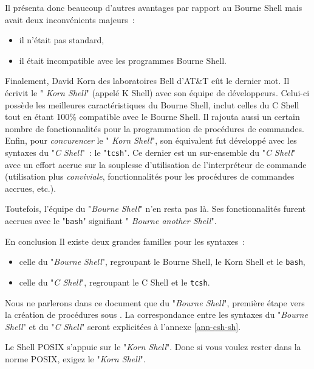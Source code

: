 Il pr{\'e}senta donc beaucoup d'autres avantages par rapport au Bourne Shell mais avait deux
inconv{\'e}nients majeurs~:
\begin{itemize}
	\item	il n'{\'e}tait pas standard,
	\item	il {\'e}tait incompatible avec les programmes Bourne Shell.
\end{itemize}

Finalement, David {\sc Korn} des laboratoires {\sc Bell} d'AT\&T e{\^u}t
le dernier mot. Il {\'e}crivit le "{\sl
Korn Shell}" (appel{\'e} K Shell) avec son {\'e}quipe de
d{\'e}veloppeurs. Celui-ci poss{\`e}de les meilleures
caract{\'e}ristiques du Bourne Shell, inclut celles du C Shell tout en
{\'e}tant 100\% compatible avec le Bourne Shell. Il rajouta aussi un
certain nombre de fonctionnalit{\'e}s pour la programmation de
proc{\'e}dures de commandes. Enfin, pour {\sl concurencer} le "{\sl
Korn Shell}", son {\'e}quivalent fut d{\'e}velopp{\'e} avec les
syntaxes du "{\sl C Shell}"~: le "{\tt tcsh}". Ce dernier est un
sur-ensemble du "{\sl C Shell}" avec un effort accrue sur la
souplesse d'utilisation de l'interpr{\'e}teur de commande (utilisation
plus {\it conviviale}, fonctionnalit{\'e}s pour les proc{\'e}dures de
commandes accrues, etc.).

Toutefois, l'{\'e}quipe du "{\sl Bourne Shell}" n'en resta pas
l{\`a}. Ses fonctionnalit{\'e}s furent accrues avec le
"{\tt bash}" signifiant "{\sl
Bourne another Shell}".

\begin{definition}{En conclusion}
Il existe deux grandes familles pour les syntaxes~:
\begin{itemize}
	\item	celle du "{\sl Bourne Shell}", regroupant
			le Bourne Shell, le Korn Shell et le {\tt bash},
	\item	celle du "{\sl C Shell}", regroupant
			le C Shell et le {\tt tcsh}.
\end{itemize}
Nous ne parlerons dans ce document que du "{\sl Bourne Shell}",
premi{\`e}re {\'e}tape vers la cr{\'e}ation de proc{\'e}dures sous
{\Unix}. La correspondance entre les syntaxes du "{\sl Bourne
Shell}" et du "{\sl C Shell}" seront explicit{\'e}es {\`a}
l'annexe \ref{ann-csh-sh}.
\end{definition}

\begin{remarque}
Le Shell POSIX s'appuie sur le "{\sl Korn Shell}". Donc si vous
voulez rester dans la norme POSIX, exigez le "{\sl Korn Shell}".
\end{remarque}


